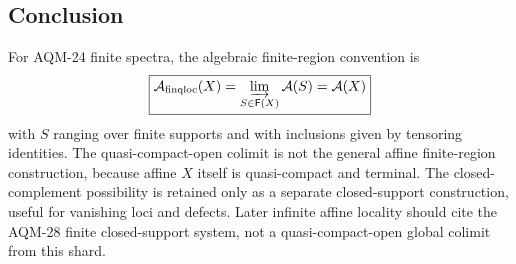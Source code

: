 \subsection{Conclusion}

For AQM-24 finite spectra, the algebraic finite-region convention is
\[
  \boxed{\mathcal A_{\rm finqloc}(X)
  =\varinjlim_{S\in\mathsf F(X)}\mathcal A(S)=\mathcal A(X)}
\]
with \(S\) ranging over finite supports and with inclusions given by tensoring
identities.  The quasi-compact-open colimit is not the general affine
finite-region construction, because affine \(X\) itself is quasi-compact and
terminal.  The closed-complement possibility is retained only as a separate
closed-support construction, useful for vanishing loci and defects.  Later
infinite affine locality should cite the AQM-28 finite closed-support system,
not a quasi-compact-open global colimit from this shard.
